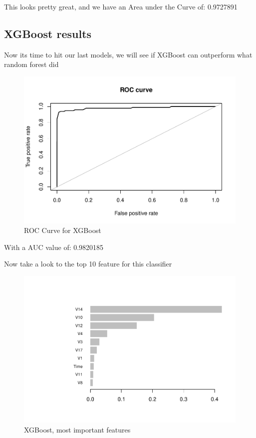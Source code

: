\documentclass[
]{article}
\begin{document}
This looks pretty great, and we have an Area under the Curve of:
0.9727891

\hypertarget{xgboost-results}{%
\subsection{XGBoost results}\label{xgboost-results}}

Now its time to hit our last models, we will see if XGBoost can
outperform what random forest did

\begin{figure}[H]

{\centering \includegraphics[width=0.7\linewidth]{fraudDetectionReport_files/figure-latex/xgboost_all-1} 

}

\caption{ROC Curve for XGBoost}\label{fig:xgboost_all}
\end{figure}

With a AUC value of: 0.9820185

Now take a look to the top 10 feature for this classifier

\begin{figure}[H]

{\centering \includegraphics[width=0.7\linewidth]{fraudDetectionReport_files/figure-latex/importance_plot-1} 

}

\caption{XGBoost, most important features}\label{fig:importance_plot}
\end{figure}
\end{document}
